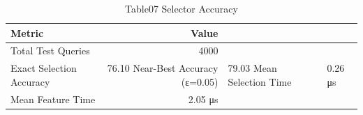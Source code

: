 \begin{table}[htbp]
\centering
\caption{Table07 Selector Accuracy}
\begin{tabular}{lr}
\hline
Metric & Value \\
\hline
Total Test Queries & 4000 \\
Exact Selection Accuracy & 76.10%
Near-Best Accuracy (ε=0.05) & 79.03%
Mean Selection Time & 0.26 μs \\
Mean Feature Time & 2.05 μs \\
\hline
\end{tabular}
\end{table}
